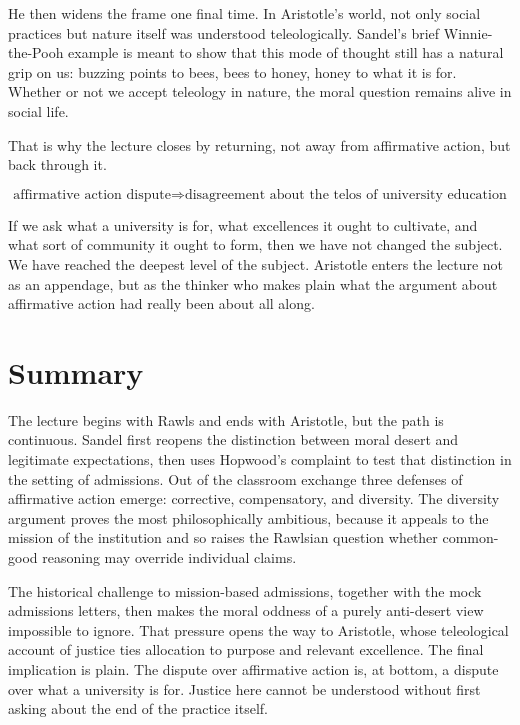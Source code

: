 He then widens the frame one final time. In Aristotle's world, not only social practices but nature itself was understood teleologically. Sandel's brief Winnie-the-Pooh example is meant to show that this mode of thought still has a natural grip on us: buzzing points to bees, bees to honey, honey to what it is for. Whether or not we accept teleology in nature, the moral question remains alive in social life.

That is why the lecture closes by returning, not away from affirmative action, but back through it.

\begin{equation}
\text{affirmative action dispute}
\Longrightarrow
\text{disagreement about the telos of university education}
\end{equation}

If we ask what a university is for, what excellences it ought to cultivate, and what sort of community it ought to form, then we have not changed the subject. We have reached the deepest level of the subject. Aristotle enters the lecture not as an appendage, but as the thinker who makes plain what the argument about affirmative action had really been about all along.

\section{Summary}

The lecture begins with Rawls and ends with Aristotle, but the path is continuous. Sandel first reopens the distinction between moral desert and legitimate expectations, then uses Hopwood's complaint to test that distinction in the setting of admissions. Out of the classroom exchange three defenses of affirmative action emerge: corrective, compensatory, and diversity. The diversity argument proves the most philosophically ambitious, because it appeals to the mission of the institution and so raises the Rawlsian question whether common-good reasoning may override individual claims.

The historical challenge to mission-based admissions, together with the mock admissions letters, then makes the moral oddness of a purely anti-desert view impossible to ignore. That pressure opens the way to Aristotle, whose teleological account of justice ties allocation to purpose and relevant excellence. The final implication is plain. The dispute over affirmative action is, at bottom, a dispute over what a university is for. Justice here cannot be understood without first asking about the end of the practice itself.